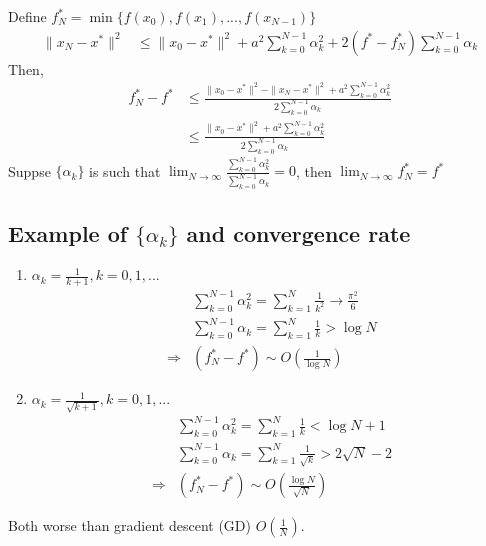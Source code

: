 \documentclass[11pt]{elegantbook}
\begin{document}
Define $f_N^*=\min\{f(x_0),f(x_1),...,f(x_{N-1})\}$
\begin{equation}
    \begin{aligned}
        \|x_{N}-x^*\|^2&\leq \|x_{0}-x^*\|^2+a^2\sum_{k=0}^{N-1}\alpha_{k}^2+2(f^*-f_N^*)\sum_{k=0}^{N-1}\alpha_k
    \end{aligned}
    \nonumber
\end{equation}
Then,
\begin{equation}
    \begin{aligned}
        f_N^*-f^*&\leq \frac{\|x_0-x^*\|^2-\|x_{N}-x^*\|^2+a^2\sum_{k=0}^{N-1}\alpha_k^2}{2\sum_{k=0}^{N-1}\alpha_k}\\
        &\leq \frac{\|x_0-x^*\|^2+a^2\sum_{k=0}^{N-1}\alpha_k^2}{2\sum_{k=0}^{N-1}\alpha_k}
    \end{aligned}
    \nonumber
\end{equation}
Suppse $\{\alpha_k\}$ is such that $\lim_{N \rightarrow	\infty}\frac{\sum_{k=0}^{N-1}\alpha_k^2}{\sum_{k=0}^{N-1}\alpha_k}=0$, then $\lim_{N \rightarrow \infty} f_N^*=f^*$

\subsection*{Example of $\{\alpha_k\}$ and convergence rate}
\begin{enumerate}[1)]
    \item $\alpha_k=\frac{1}{k+1},k=0,1,...$
    \begin{equation}
        \begin{aligned}
            &\sum_{k=0}^{N-1}\alpha_k^2=\sum_{k=1}^{N}\frac{1}{k^2}\rightarrow \frac{\pi^2}{6}\\
            &\sum_{k=0}^{N-1}\alpha_k=\sum_{k=1}^{N}\frac{1}{k}>\log N\\
            \Rightarrow&(f^*_N-f^*)\sim O(\frac{1}{\log N})
        \end{aligned}
        \nonumber
    \end{equation}
    \item $\alpha_k=\frac{1}{\sqrt{k+1}},k=0,1,...$
    \begin{equation}
        \begin{aligned}
            &\sum_{k=0}^{N-1}\alpha_k^2=\sum_{k=1}^{N}\frac{1}{k}<\log N+1\\
            &\sum_{k=0}^{N-1}\alpha_k=\sum_{k=1}^{N}\frac{1}{\sqrt{k}}>2\sqrt{N}-2\\
            \Rightarrow&(f^*_N-f^*)\sim O(\frac{\log N}{\sqrt{N}})
        \end{aligned}
        \nonumber
    \end{equation}
\end{enumerate}
Both worse than gradient descent (GD) $O(\frac{1}{N})$.
\end{document}
